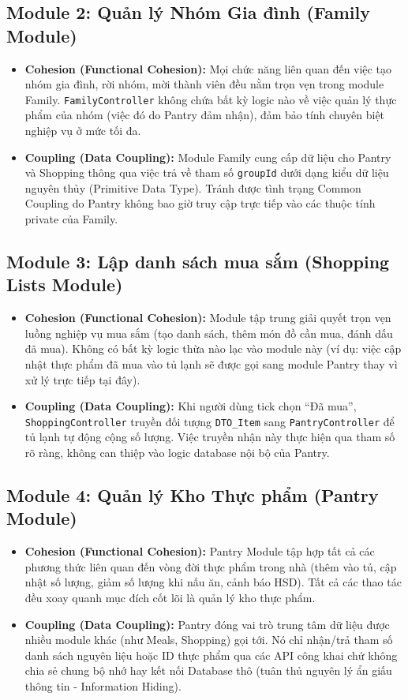 \documentclass[12pt,a4paper]{article}
\begin{document}
\subsection{Module 2: Quản lý Nhóm Gia đình (Family Module)}
\begin{itemize}
    \item \textbf{Cohesion (Functional Cohesion):} Mọi chức năng liên quan đến việc tạo nhóm gia đình, rời nhóm, mời thành viên đều nằm trọn vẹn trong module Family. \texttt{FamilyController} không chứa bất kỳ logic nào về việc quản lý thực phẩm của nhóm (việc đó do Pantry đảm nhận), đảm bảo tính chuyên biệt nghiệp vụ ở mức tối đa.
    \item \textbf{Coupling (Data Coupling):} Module Family cung cấp dữ liệu cho Pantry và Shopping thông qua việc trả về tham số \texttt{groupId} dưới dạng kiểu dữ liệu nguyên thủy (Primitive Data Type). Tránh được tình trạng Common Coupling do Pantry không bao giờ truy cập trực tiếp vào các thuộc tính private của Family.
\end{itemize}

\subsection{Module 3: Lập danh sách mua sắm (Shopping Lists Module)}
\begin{itemize}
    \item \textbf{Cohesion (Functional Cohesion):} Module tập trung giải quyết trọn vẹn luồng nghiệp vụ mua sắm (tạo danh sách, thêm món đồ cần mua, đánh dấu đã mua). Không có bất kỳ logic thừa nào lạc vào module này (ví dụ: việc cập nhật thực phẩm đã mua vào tủ lạnh sẽ được gọi sang module Pantry thay vì xử lý trực tiếp tại đây).
    \item \textbf{Coupling (Data Coupling):} Khi người dùng tick chọn ``Đã mua'', \texttt{ShoppingController} truyền đối tượng \texttt{DTO\_Item} sang \texttt{PantryController} để tủ lạnh tự động cộng số lượng. Việc truyền nhận này thực hiện qua tham số rõ ràng, không can thiệp vào logic database nội bộ của Pantry.
\end{itemize}

\subsection{Module 4: Quản lý Kho Thực phẩm (Pantry Module)}
\begin{itemize}
    \item \textbf{Cohesion (Functional Cohesion):} Pantry Module tập hợp tất cả các phương thức liên quan đến vòng đời thực phẩm trong nhà (thêm vào tủ, cập nhật số lượng, giảm số lượng khi nấu ăn, cảnh báo HSD). Tất cả các thao tác đều xoay quanh mục đích cốt lõi là quản lý kho thực phẩm.
    \item \textbf{Coupling (Data Coupling):} Pantry đóng vai trò trung tâm dữ liệu được nhiều module khác (như Meals, Shopping) gọi tới. Nó chỉ nhận/trả tham số danh sách nguyên liệu hoặc ID thực phẩm qua các API công khai chứ không chia sẻ chung bộ nhớ hay kết nối Database thô (tuân thủ nguyên lý ẩn giấu thông tin - Information Hiding).
\end{itemize}
\end{document}
